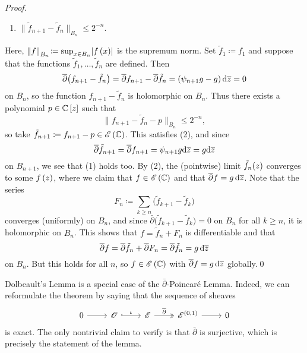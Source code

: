 \documentclass[../Moduli_Spaces_of_Riemann_Surfaces.tex]{subfiles}
\begin{document}
\begin{proof}
\begin{enumerate}
                \vspace{-0.05in}
            \item $\big\|\tilde{f}_{n+1}-\tilde{f}_n\big\|_{B_n}\!\leq 2^{-n}$.
        \end{enumerate}
        Here, $\left\|f\right\|_{B_n}\!\coloneqq\sup_{x\in B_n}\!\left|f\left(x\right)\right|$ is the supremum norm.
        Set $\tilde{f}_1\coloneqq f_1$ and suppose that the functions $\tilde{f}_1,\dots,\tilde{f}_n$ are defined. Then
        \begin{equation*}
            \overline{\partial}\big(f_{n+1}-\tilde{f}_n\big)=\overline{\partial}f_{n+1}-\overline\partial\tilde{f}_n=\left(\psi_{n+1}g-g\right)\mathrm{d}\overline{z}=0
        \end{equation*}
        on $B_n$, so the function $f_{n+1}-\tilde{f}_n$ is holomorphic on $B_n$. Thus there exists a polynomial $p\in\mathbb{C}\left[z\right]$ such that
        \begin{equation*}
            \big\|f_{n+1}-\tilde{f}_n-p\big\|_{B_n}\!\leq 2^{-n},
        \end{equation*}
        so take $\tilde{f}_{n+1}\coloneqq f_{n+1}-p\in\mathscr{E}\left(\mathbb{C}\right)$. This satisfies (2), and since
        \begin{equation*}
            \overline{\partial}\tilde{f}_{n+1}=\overline{\partial}f_{n+1}=\psi_{n+1}g\mathrm{d}\overline{z}=g\mathrm{d}\overline{z}
        \end{equation*}
        on $B_{n+1}$, we see that (1) holds too. By (2), the (pointwise) limit $\tilde{f}_n\!\left(z\right)$ converges to some $f\left(z\right)$, where we claim that  $f\in\mathscr{E}\left(\mathbb{C}\right)$ and that $\overline{\partial}f=g\,\mathrm{d}\overline{z}$. Note that the series
        \begin{equation*}
            F_n\coloneqq\sum_{k\geq n}\big(\tilde{f}_{k+1}-\tilde{f}_k\big)
        \end{equation*}
        converges (uniformly) on $B_n$, and since $\bar{\partial}\big(\tilde{f}_{k+1}-\tilde{f}_k\big)=0$ on $B_n$ for all $k\geq n$, it is holomorphic on $B_n$. This shows that $f=\tilde{f}_n+F_n$ is differentiable and that
        \begin{equation*}
            \overline{\partial}f=\overline{\partial}\tilde{f}_n+\overline{\partial}F_n=\overline{\partial}\tilde{f}_n=g\,\mathrm{d}\overline{z}
        \end{equation*}
        on $B_n$. But this holds for all $n$, so $f\in\mathscr{E}\left(\mathbb{C}\right)$ with $\overline{\partial}f=g\,\mathrm{d}\overline{z}$ globally.\qed
    \end{proof}
    \begin{remark}
        Dolbeault's Lemma is a special case of the $\bar{\partial}$-Poincaré Lemma. Indeed, we can reformulate the theorem by saying that the sequence of sheaves
        \begin{equation*}
            \begin{tikzcd}
                0 \ar[r] & \HOLO \ar[r, "\iota", hookrightarrow] & \DIFF \ar[r, "\bar{\partial}", twoheadrightarrow] & \DIFF^{\l(0,1\r)} \ar[r] & 0
            \end{tikzcd}
        \end{equation*}
        is exact. The only nontrivial claim to verify is that $\bar{\partial}$ is surjective, which is precisely the statement of the lemma.\exqed
    \end{remark}
\end{document}
